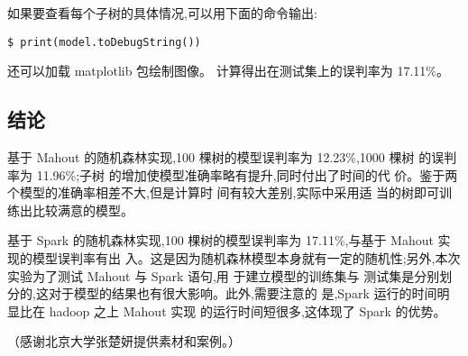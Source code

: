 如果要查看每个子树的具体情况,可以用下面的命令输出:

\begin{lstlisting}
$ print(model.toDebugString())
\end{lstlisting}

还可以加载 matplotlib 包绘制图像。 计算得出在测试集上的误判率为
17.11\%。

\subsection{结论}\label{ux7ed3ux8bba}

基于 Mahout 的随机森林实现,100 棵树的模型误判率为 12.23\%,1000 棵树
的误判率为 11.96\%;子树 的增加使模型准确率略有提升,同时付出了时间的代
价。鉴于两个模型的准确率相差不大,但是计算时 间有较大差别,实际中采用适
当的树即可训练出比较满意的模型。

基于 Spark 的随机森林实现,100 棵树的模型误判率为 17.11\%,与基于 Mahout
实现的模型误判率有出
入。这是因为随机森林模型本身就有一定的随机性;另外,本次实验为了测试
Mahout 与 Spark 语句,用 于建立模型的训练集与
测试集是分别划分的,这对于模型的结果也有很大影响。此外,需要注意的
是,Spark 运行的时间明显比在 hadoop 之上 Mahout 实现
的运行时间短很多,这体现了 Spark 的优势。

（感谢北京大学张楚妍提供素材和案例。）
